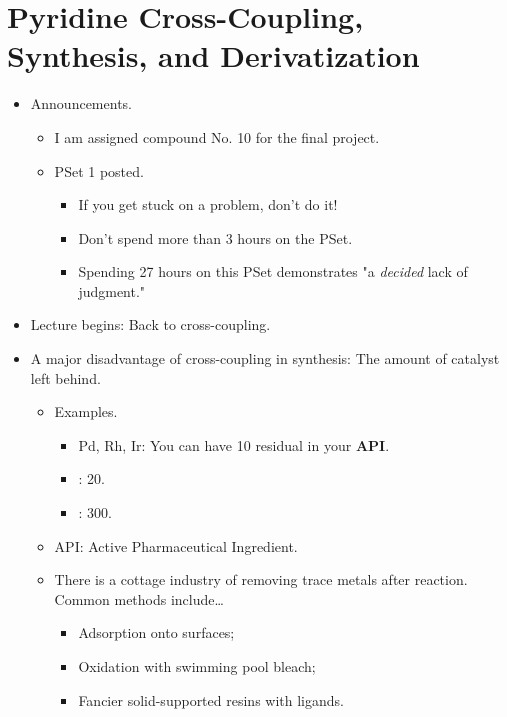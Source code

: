 \documentclass[../notes.tex]{subfiles}
\begin{document}
\section{Pyridine Cross-Coupling, Synthesis, and Derivatization}
\begin{itemize}
    \item {}Announcements.
    \begin{itemize}
        \item I am assigned compound No. 10 for the final project.
        \item PSet 1 posted.
        \begin{itemize}
            \item If you get stuck on a problem, don't do it!
            \item Don't spend more than 3 hours on the PSet.
            \item Spending 27 hours on this PSet demonstrates "a \emph{decided} lack of judgment."
        \end{itemize}
    \end{itemize}
    \item Lecture begins: Back to cross-coupling.
    \pagebreak
    \item A major disadvantage of cross-coupling in synthesis: The amount of catalyst left behind.
    \begin{itemize}
        \item Examples.
        \begin{itemize}
            \item Pd, Rh, Ir: You can have \SI{10}{\partspermillion} residual in your \textbf{API}.
            \item {}: \SI{20}{\partspermillion}.
            \item {}: \SI{300}{\partspermillion}.
        \end{itemize}
        \item API: Active Pharmaceutical Ingredient.
        \item There is a cottage industry of removing trace metals after reaction. Common methods include\dots
        \begin{itemize}
            \item Adsorption onto surfaces;
            \item Oxidation with swimming pool bleach;
            \item Fancier solid-supported resins with ligands.
        \end{itemize}

\end{itemize}
\end{itemize}
\end{document}
